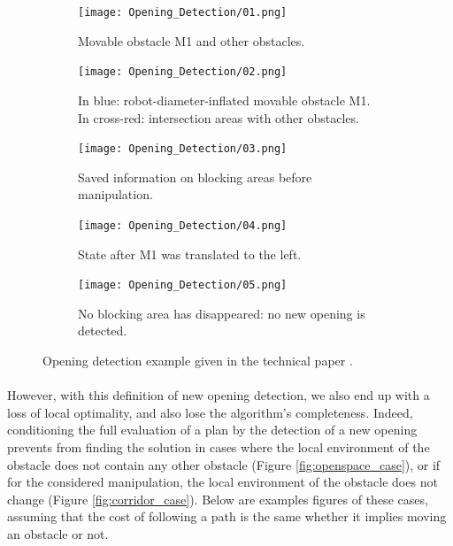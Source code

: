\begin{figure}[H]

\begin{subfigure}{0.19\textwidth}
\texttt{[image: Opening\_Detection/01.png]}
\caption{Movable obstacle M1 and other obstacles.} \label{fig:opening_detection_01}
\end{subfigure}\hspace*{\fill}
\begin{subfigure}{0.19\textwidth}
\texttt{[image: Opening\_Detection/02.png]}
\caption{In blue: robot-diameter-inflated movable obstacle M1. In cross-red: intersection areas with other obstacles.} \label{fig:opening_detection_02}
\end{subfigure}\hspace*{\fill}
\begin{subfigure}{0.19\textwidth}
\texttt{[image: Opening\_Detection/03.png]}
\caption{Saved information on blocking areas before manipulation.} \label{fig:opening_detection_03}
\end{subfigure}\hspace*{\fill}
\begin{subfigure}{0.19\textwidth}
\texttt{[image: Opening\_Detection/04.png]}
\caption{State after M1 was translated to the left.} \label{fig:opening_detection_04}
\end{subfigure}\hspace*{\fill}
\begin{subfigure}{0.19\textwidth}
\texttt{[image: Opening\_Detection/05.png]}
\caption{No blocking area has disappeared: no new opening is detected.} \label{fig:opening_detection_05}
\end{subfigure}

\caption{Opening detection example given in the technical paper \parencite{levihn_efficient_2011}.}
\label{fig:opening_detection_figures}
\end{figure}

\paragraph{} However, with this definition of new opening detection, we also end up with a loss of local optimality, and also lose the algorithm's completeness. Indeed, conditioning the full evaluation of a plan by the detection of a new opening prevents from finding the solution in cases where the local environment of the obstacle does not contain any other obstacle (Figure \ref{fig:openspace_case}), or if for the considered manipulation, the local environment of the obstacle does not change (Figure \ref{fig:corridor_case}). Below are examples figures of these cases, assuming that the cost of following a path is the same whether it implies moving an obstacle or not.

